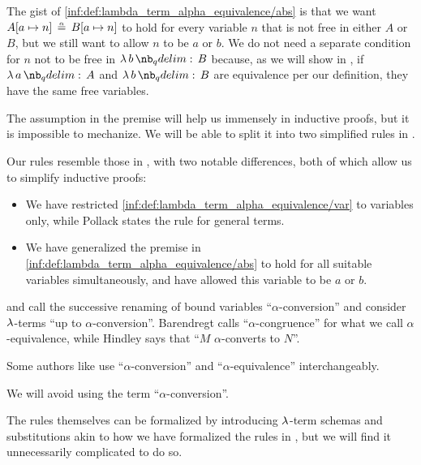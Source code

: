 \begin{comments}
  \item The gist of \ref{inf:def:lambda_term_alpha_equivalence/abs} is that we want \( A[a \mapsto n] \aequiv B[a \mapsto n] \) to hold for every variable \( n \) that is not free in either \( A \) or \( B \), but we still want to allow \( n \) to be \( a \) or \( b \). We do not need a separate condition for \( n \) not to be free in \( \qabs b B \) because, as we will show in , if \( \qabs a A \) and \( \qabs b B \) are equivalence per our definition, they have the same free variables.

  The assumption in the premise will help us immensely in inductive proofs, but it is impossible to mechanize. We will be able to split it into two simplified rules in .

  \item Our rules resemble those in \cite[5]{Pollack2005AlphaConversion}, with two notable differences, both of which allow us to simplify inductive proofs:
  \begin{itemize}
    \item We have restricted \ref{inf:def:lambda_term_alpha_equivalence/var} to variables only, while Pollack states the rule for general terms.
    \item We have generalized the premise in \ref{inf:def:lambda_term_alpha_equivalence/abs} to hold for all suitable variables simultaneously, and have allowed this variable to be \( a \) or \( b \).
  \end{itemize}

  \item {} and  call the successive renaming of bound variables \enquote{\( \alpha \)-conversion} and consider \( \mathrm{\lambda} \)-terms \enquote{up to \( \alpha \)-conversion}. Barendregt calls \enquote{\( \alpha \)-congruence} for what we call \( \alpha \)-equivalence, while Hindley says that \enquote{\( M \) \( \alpha \)-converts to \( N \)}.

  Some authors like  use \enquote{\( \alpha \)-conversion} and \enquote{\( \alpha \)-equivalence} interchangeably.

  We will avoid using the term \enquote{\( \alpha \)-conversion}.

  \item The rules themselves can be formalized by introducing \( \mathrm{\lambda} \)-term schemas and substitutions akin to how we have formalized the rules in , but we will find it unnecessarily complicated to do so.
\end{comments}

